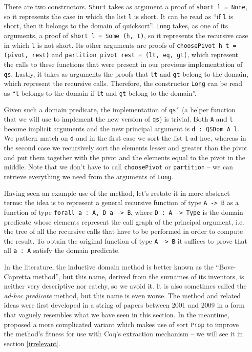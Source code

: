 \documentclass[declaration,mgr,english,shortabstract]{iithesis}
\newcommand{\m}[1]{\texttt{#1}}
\begin{document}
There are two constructors. \m{Short} takes as argument a proof of \m{short l = None}, so it represents the case in which the list \m{l} is short. It can be read as ``if \m{l} is short, then it belongs to the domain of quicksort''. \m{Long} takes, as one of its arguments, a proof of \m{short l = Some (h, t)}, so it represents the recursive case in which \m{l} is not short. Its other arguments are proofs of \m{choosePivot h t = (pivot, rest)} and \m{partition pivot rest = (lt, eq, gt)}, which represent the calls to these functions that were present in our previous implementation of \m{qs}. Lastly, it takes as arguments the proofs that \m{lt} and \m{gt} belong to the domain, which represent the recursive calls. Therefore, the constructor \m{Long} can be read as ``\m{l} belongs to the domain if \m{lt} and \m{gt} belong to the domain''.

Given such a domain predicate, the implementation of \m{qs'} (a helper function that we will use to implement the new version of \m{qs}) is trivial. Both \m{A} and \m{l} become implicit arguments and the new principal argument is \m{d\ :\ QSDom A l}. We pattern match on \m{d} and in the first case we sort the list \m{l} ad hoc, whereas in the second case we recursively sort the elements lesser and greater than the pivot and put them together with the pivot and the elements equal to the pivot in the middle. Note that we don't have to call \m{choosePivot} or \m{partition} -- we can retrieve everything we need from the arguments of \m{Long}.

Having seen an example use of the method, let's restate it in more abstract terms: the idea is to represent a general recursive function of type \m{A -> B} as a function of type \m{forall a\ :\ A, D a -> B}, where \m{D\ :\ A -> Type} is the domain predicate whose elements represent the call graph of the principal argument, i.e. the tree of all the recursive calls that have to be performed in order to compute the result. To obtain the original function of type \m{A -> B} it suffices to prove that all \m{a\ :\ A} satisfy the domain predicate.

In the literature, the inductive domain method is better known as the ``Bove-Capretta method'', but this name, derived from the surnames of its inventors, is neither very descriptive nor catchy, so we avoid it. It is also sometimes called the \textit{ad-hoc predicate} method, but this name is even worse. The method and related ideas were first developed in a string of papers between 2001 and 2009 \cite{BCM1} \cite{BCM2} \cite{BCM3} \cite{BCM4} \cite{BCM5} \cite{BCM6} \cite{BCM7} \cite{BCM8} \cite{BCM9} in a form that vaguely resembles what we have seen in this section. In the meantime, \cite{CoqArt} proposed a more complicated variant which makes use of sort \m{Prop} to improve the method's fitness for use with Coq's extraction mechanism -- we will see it in section \ref{irrelevant}.
\end{document}
